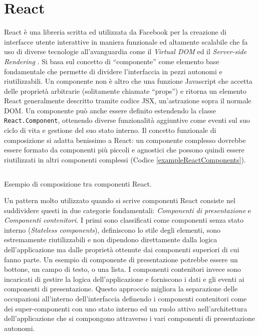 \section{React}
\label{ReactExplanation}
React è una libreria scritta ed utilizzata da Facebook per la creazione di interfacce utente interattive in maniera funzionale ed altamente scalabile che fa uso di diverse tecnologie all'avanguardia come il \textit{Virtual DOM} ed il \textit{Server-side Rendering} \cite{WheelerOnReact}. 
Si basa sul concetto di “componente” come elemento base fondamentale che permette di dividere l'interfaccia in pezzi autonomi e riutilizzabili.
Un componente non è altro che una funzione Javascript che accetta delle proprietà arbitrarie (solitamente chiamate “props”) e ritorna un elemento React generalmente descritto tramite codice JSX, un'astrazione sopra il normale DOM. Un componente può anche essere definito estendendo la classe \texttt{React.Component}, ottenendo diverse funzionalità aggiuntive come eventi sul suo ciclo di vita e gestione del suo stato interno. Il concetto funzionale di composizione si adatta benissimo a React: un componente complesso dovrebbe essere formato da componenti più piccoli e agnostici che possono quindi essere riutilizzati in altri componenti complessi (Codice \ref{exampleReactComponents}).

\begin{listing}[ht]
\inputminted{jsx}{sources/exampleReactComponents.js}
\caption{Esempio di composizione tra componenti React.}
\label{exampleReactComponents}
\end{listing}

Un pattern molto utilizzato quando si scrive componenti React consiste nel suddividere questi in due categorie fondamentali: \textit{Componenti di presentazione} e \textit{Componenti contenitori}. I primi sono classificati come componenti senza stato interno (\textit{Stateless components}), definiscono lo stile degli elementi, sono estremamente riutilizzabili e non dipendono direttamente dalla logica dell'applicazione ma dalle proprietà ottenute dai componenti superiori di cui fanno parte. Un esempio di componente di presentazione potrebbe essere un bottone, un campo di testo, o una lista.
I componenti contenitori invece sono incaricati di gestire la logica dell'applicazione e forniscono i dati e gli eventi ai componenti di presentazione. Questo approccio migliora la separazione delle occupazioni all'interno dell'interfaccia definendo i componenti contenitori come dei super-componenti con uno stato interno ed un ruolo attivo nell'architettura dell'applicazione che si compongono attraverso i vari componenti di presentazione autonomi.

